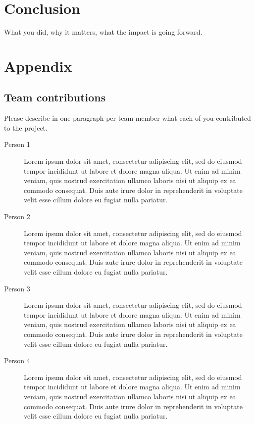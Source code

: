 \documentclass[10pt,twocolumn,letterpaper]{article}
\begin{document}
\begin{enumerate}
\end{enumerate}

\section{Conclusion}

What you did, why it matters, what the impact is going forward.

{\small


}

\section*{Appendix}

\subsection*{Team contributions}

Please describe in one paragraph per team member what each of you contributed to the project.
\begin{description}
\item[Person 1] Lorem ipsum dolor sit amet, consectetur adipiscing elit, sed do eiusmod tempor incididunt ut labore et dolore magna aliqua. Ut enim ad minim veniam, quis nostrud exercitation ullamco laboris nisi ut aliquip ex ea commodo consequat. Duis aute irure dolor in reprehenderit in voluptate velit esse cillum dolore eu fugiat nulla pariatur. 
\item[Person 2] Lorem ipsum dolor sit amet, consectetur adipiscing elit, sed do eiusmod tempor incididunt ut labore et dolore magna aliqua. Ut enim ad minim veniam, quis nostrud exercitation ullamco laboris nisi ut aliquip ex ea commodo consequat. Duis aute irure dolor in reprehenderit in voluptate velit esse cillum dolore eu fugiat nulla pariatur.
\item [Person 3] Lorem ipsum dolor sit amet, consectetur adipiscing elit, sed do eiusmod tempor incididunt ut labore et dolore magna aliqua. Ut enim ad minim veniam, quis nostrud exercitation ullamco laboris nisi ut aliquip ex ea commodo consequat. Duis aute irure dolor in reprehenderit in voluptate velit esse cillum dolore eu fugiat nulla pariatur. 
\item [Person 4] Lorem ipsum dolor sit amet, consectetur adipiscing elit, sed do eiusmod tempor incididunt ut labore et dolore magna aliqua. Ut enim ad minim veniam, quis nostrud exercitation ullamco laboris nisi ut aliquip ex ea commodo consequat. Duis aute irure dolor in reprehenderit in voluptate velit esse cillum dolore eu fugiat nulla pariatur.
\end{description}
\end{document}
